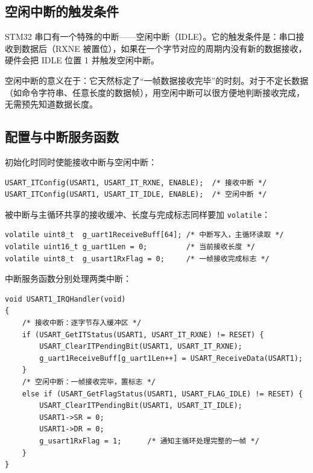 \subsection{空闲中断的触发条件}

STM32 串口有一个特殊的中断——空闲中断（IDLE）。它的触发条件是：串口接收到数据后（RXNE 被置位），如果在一个字节对应的周期内没有新的数据接收，硬件会把 IDLE 位置 1 并触发空闲中断。

空闲中断的意义在于：它天然标定了“一帧数据接收完毕”的时刻。对于不定长数据（如命令字符串、任意长度的数据帧），用空闲中断可以很方便地判断接收完成，无需预先知道数据长度。

\subsection{配置与中断服务函数}

初始化时同时使能接收中断与空闲中断：

\begin{lstlisting}[style=c]
USART_ITConfig(USART1, USART_IT_RXNE, ENABLE);  /* 接收中断 */
USART_ITConfig(USART1, USART_IT_IDLE, ENABLE);  /* 空闲中断 */
\end{lstlisting}

被中断与主循环共享的接收缓冲、长度与完成标志同样要加 \texttt{volatile}：

\begin{lstlisting}[style=c]
volatile uint8_t  g_uart1ReceiveBuff[64]; /* 中断写入，主循环读取 */
volatile uint16_t g_uart1Len = 0;         /* 当前接收长度 */
volatile uint8_t  g_usart1RxFlag = 0;     /* 一帧接收完成标志 */
\end{lstlisting}

中断服务函数分别处理两类中断：

\begin{lstlisting}[style=c]
void USART1_IRQHandler(void)
{
    /* 接收中断：逐字节存入缓冲区 */
    if (USART_GetITStatus(USART1, USART_IT_RXNE) != RESET) {
        USART_ClearITPendingBit(USART1, USART_IT_RXNE);
        g_uart1ReceiveBuff[g_uart1Len++] = USART_ReceiveData(USART1);
    }
    /* 空闲中断：一帧接收完毕，置标志 */
    else if (USART_GetFlagStatus(USART1, USART_FLAG_IDLE) != RESET) {
        USART_ClearITPendingBit(USART1, USART_IT_IDLE);
        USART1->SR = 0;
        USART1->DR = 0;
        g_usart1RxFlag = 1;      /* 通知主循环处理完整的一帧 */
    }
}
\end{lstlisting}


